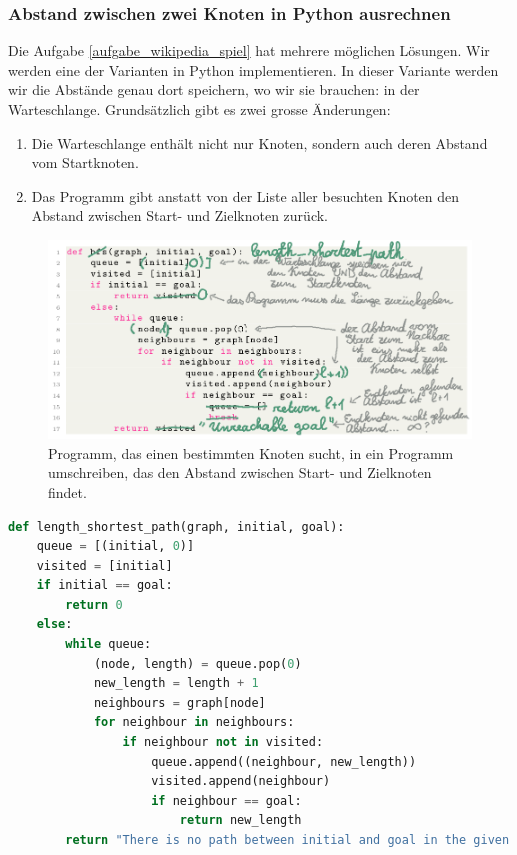 \subsubsection*{Abstand zwischen zwei Knoten in Python ausrechnen}
Die Aufgabe \ref{aufgabe_wikipedia_spiel} hat mehrere möglichen Lösungen. Wir werden eine der Varianten in Python implementieren. In dieser Variante werden wir die Abstände genau dort speichern, wo wir sie brauchen: in der Warteschlange. Grundsätzlich gibt es zwei grosse Änderungen:
\begin{enumerate}
    \item Die Warteschlange enthält nicht nur Knoten, sondern auch deren Abstand vom Startknoten.
    \item Das Programm gibt anstatt von der Liste aller besuchten Knoten den Abstand zwischen Start- und Zielknoten zurück.
\end{enumerate}

\begin{figure}[H]
    \centering
    \includegraphics[width=\textwidth]{Pictures/SP/bfs_goal-to-length.png}
    \caption{Programm, das einen bestimmten Knoten sucht, in ein Programm umschreiben, das den Abstand zwischen Start- und Zielknoten findet.}
    \label{fig:bfs_goal_to_length}
\end{figure}

\begin{lstlisting}[language=Python, caption={Programm, das den Abstand zwischen \texttt{initial} und \texttt{goal} berechnet.}, label={lst:length_shortest_path}]
def length_shortest_path(graph, initial, goal):
    queue = [(initial, 0)]
    visited = [initial]
    if initial == goal:
        return 0
    else:
        while queue:
            (node, length) = queue.pop(0)
            new_length = length + 1
            neighbours = graph[node]
            for neighbour in neighbours:
                if neighbour not in visited:
                    queue.append((neighbour, new_length))
                    visited.append(neighbour)
                    if neighbour == goal:
                        return new_length
        return "There is no path between initial and goal in the given graph"
\end{lstlisting}

